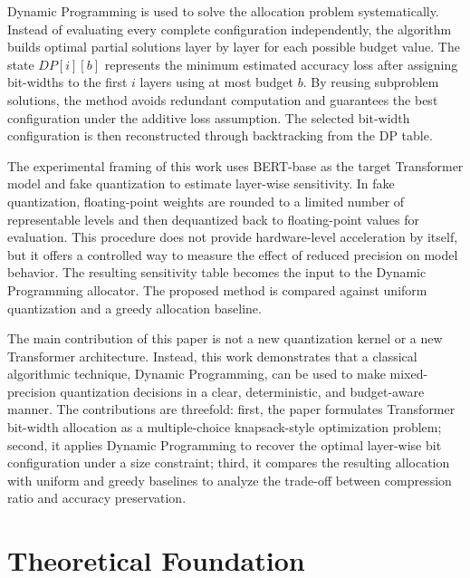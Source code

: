 \documentclass[conference]{IEEEtran}
\begin{document}
Dynamic Programming is used to solve the allocation problem systematically. Instead of evaluating every complete configuration independently, the algorithm builds optimal partial solutions layer by layer for each possible budget value. The state $DP[i][b]$ represents the minimum estimated accuracy loss after assigning bit-widths to the first $i$ layers using at most budget $b$. By reusing subproblem solutions, the method avoids redundant computation and guarantees the best configuration under the additive loss assumption. The selected bit-width configuration is then reconstructed through backtracking from the DP table.

The experimental framing of this work uses BERT-base as the target Transformer model and fake quantization to estimate layer-wise sensitivity. In fake quantization, floating-point weights are rounded to a limited number of representable levels and then dequantized back to floating-point values for evaluation. This procedure does not provide hardware-level acceleration by itself, but it offers a controlled way to measure the effect of reduced precision on model behavior. The resulting sensitivity table becomes the input to the Dynamic Programming allocator. The proposed method is compared against uniform quantization and a greedy allocation baseline.

The main contribution of this paper is not a new quantization kernel or a new Transformer architecture. Instead, this work demonstrates that a classical algorithmic technique, Dynamic Programming, can be used to make mixed-precision quantization decisions in a clear, deterministic, and budget-aware manner. The contributions are threefold: first, the paper formulates Transformer bit-width allocation as a multiple-choice knapsack-style optimization problem; second, it applies Dynamic Programming to recover the optimal layer-wise bit configuration under a size constraint; third, it compares the resulting allocation with uniform and greedy baselines to analyze the trade-off between compression ratio and accuracy preservation.

\section{Theoretical Foundation}
\end{document}
